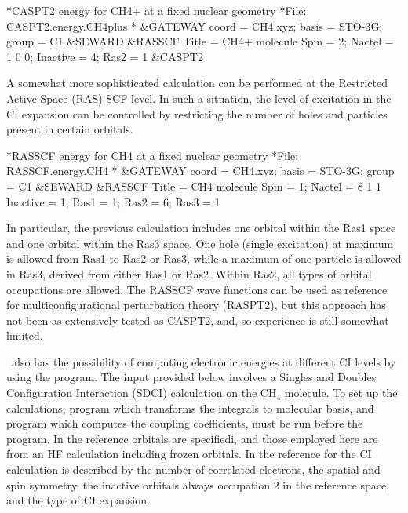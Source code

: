 \begin{inputlisting}
*CASPT2 energy for CH4+ at a fixed nuclear geometry
*File: CASPT2.energy.CH4plus
*
&GATEWAY
 coord = CH4.xyz; basis = STO-3G; group = C1
&SEWARD
&RASSCF
   Title = CH4+ molecule
   Spin = 2; Nactel = 1 0 0; Inactive = 4; Ras2 = 1
&CASPT2
\end{inputlisting}

A somewhat more sophisticated calculation can be performed at the
Restricted Active Space (RAS) SCF level. In such a situation, the level of excitation
in the CI expansion can be controlled by restricting the number of holes
and particles present in certain orbitals. 

\begin{inputlisting}
*RASSCF energy for CH4 at a fixed nuclear geometry
*File: RASSCF.energy.CH4
*
&GATEWAY
 coord = CH4.xyz; basis = STO-3G; group = C1
&SEWARD
&RASSCF
   Title = CH4 molecule
   Spin = 1; Nactel = 8 1 1
   Inactive = 1; Ras1 = 1; Ras2 = 6; Ras3 = 1
\end{inputlisting}

In particular, the previous calculation includes one orbital within the Ras1
space and one orbital within the Ras3 space. One hole (single excitation) at
maximum is allowed from Ras1 to Ras2 or Ras3, while a maximum of one particle
is allowed in Ras3, derived from either Ras1 or Ras2. Within Ras2, all types
of orbital occupations are allowed. The RASSCF wave functions can be used 
as reference for multiconfigurational perturbation theory (RASPT2), but
this approach has not been as extensively tested as CASPT2, and, so experience is
still somewhat limited.

\molcas\ also has the possibility of computing electronic energies at 
different CI levels by using the  program. The input provided below involves
a Singles and Doubles Configuration Interaction  (SDCI) calculation on the CH$_4$ molecule.
To set up the calculations, program  which transforms
the integrals to molecular basis, and program  which computes the
coupling coefficients, must be run before the  program.
In  the reference orbitals are specifiedi, and those employed 
here are from an HF  calculation including frozen orbitals. In 
the reference for the CI calculation is described by the number of correlated electrons,
the spatial and spin symmetry, the inactive orbitals always occupation 2 in
the reference space, and the type of CI expansion. 

